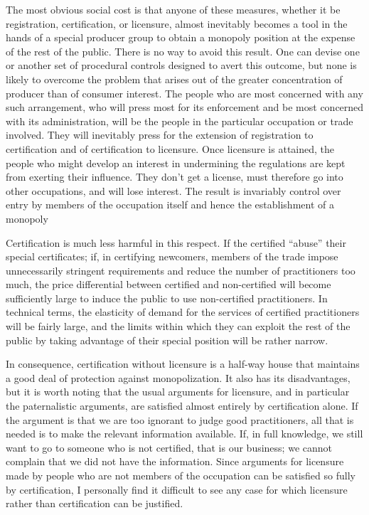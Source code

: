 \documentclass[11pt,openany]{book}
\begin{document}
The most obvious social cost is that anyone of these measures, whether it be registration, certification, or licensure, almost inevitably becomes a tool in the hands of a special producer group to obtain a monopoly position at the expense of the rest of the public. There is no way to avoid this result. One can devise one or another set of procedural controls designed to avert this outcome, but none is likely to overcome the problem that arises out of the greater concentration of producer than of consumer interest. The people who are most concerned with any such arrangement, who will press most for its enforcement and be most concerned with its administration, will be the people in the particular occupation or trade involved. They will inevitably press for the extension of registration to certification and of certification to licensure. Once licensure is attained, the people who might develop an interest in undermining the regulations are kept from exerting their influence. They don't get a license, must therefore go into other occupations, and will lose interest. The result is invariably control over entry by members of the occupation itself and hence the establishment of a monopoly

Certification is much less harmful in this respect. If the certified ``abuse'' their special certificates; if, in certifying newcomers, members of the trade impose unnecessarily stringent requirements and reduce the number of practitioners too much, the price differential between certified and non-certified will become sufficiently large to induce the public to use non-certified practitioners. In technical terms, the elasticity of demand for the services of certified practitioners will be fairly large, and the limits within which they can exploit the rest of the public by taking advantage of their special position will be rather narrow.

In consequence, certification without licensure is a half-way house that maintains a good deal of protection against monopolization. It also has its disadvantages, but it is worth noting that the usual arguments for licensure, and in particular the paternalistic arguments, are satisfied almost entirely by certification alone. If the argument is that we are too ignorant to judge good practitioners, all that is needed is to make the relevant information available. If, in full knowledge, we still want to go to someone who is not certified, that is our business; we cannot complain that we did not have the information. Since arguments for licensure made by people who are not members of the occupation can be satisfied so fully by certification, I personally find it difficult to see any case for which licensure rather than certification can be justified.
\end{document}
